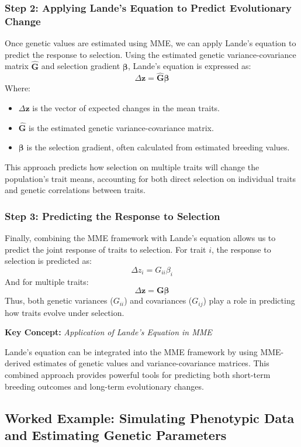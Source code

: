 \documentclass[12pt,a4paper]{article}
\newenvironment{keyconceptbox}[1][]
{\begin{basebox}[linecolor=uqblue]
\textbf{\color{uqblue}Key Concept:} \textit{#1}\par\noindent\ignorespaces}
{\end{basebox}}
\begin{document}
\subsubsection{Step 2: Applying Lande’s Equation to Predict Evolutionary Change}

Once genetic values are estimated using MME, we can apply Lande’s equation to predict the response to selection. Using the estimated genetic variance-covariance matrix \( \hat{\mathbf{G}} \) and selection gradient \( \boldsymbol{\beta} \), Lande’s equation is expressed as:
\[
\Delta \mathbf{z} = \hat{\mathbf{G}} \boldsymbol{\beta}
\]
Where:
\begin{itemize}
    \item \( \Delta \mathbf{z} \) is the vector of expected changes in the mean traits.
    \item \( \hat{\mathbf{G}} \) is the estimated genetic variance-covariance matrix.
    \item \( \boldsymbol{\beta} \) is the selection gradient, often calculated from estimated breeding values.
\end{itemize}
This approach predicts how selection on multiple traits will change the population’s trait means, accounting for both direct selection on individual traits and genetic correlations between traits.

\subsubsection{Step 3: Predicting the Response to Selection}

Finally, combining the MME framework with Lande’s equation allows us to predict the joint response of traits to selection. For trait \( i \), the response to selection is predicted as:
\[
\Delta z_i = G_{ii} \beta_i
\]
And for multiple traits:
\[
\Delta \mathbf{z} = \mathbf{G} \boldsymbol{\beta}
\]
Thus, both genetic variances (\( G_{ii} \)) and covariances (\( G_{ij} \)) play a role in predicting how traits evolve under selection.

\begin{keyconceptbox}[Application of Lande’s Equation in MME]
Lande’s equation can be integrated into the MME framework by using MME-derived estimates of genetic values and variance-covariance matrices. This combined approach provides powerful tools for predicting both short-term breeding outcomes and long-term evolutionary changes.
\end{keyconceptbox}

\subsection{Worked Example: Simulating Phenotypic Data and Estimating Genetic Parameters}
\end{document}
